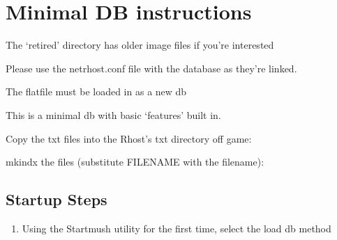 \documentclass[letterpaper,10pt,english]{sphinxmanual}
\begin{document}
\section{Minimal DB instructions}
\label{\detokenize{gettingstarted:minimal-db-instructions}}
\sphinxAtStartPar
The ‘retired’ directory has older image files if you’re interested

\sphinxAtStartPar
Please use the netrhost.conf file with the database as they’re linked.

\sphinxAtStartPar
The flatfile must be loaded in as a new db

\sphinxAtStartPar
This is a minimal db with basic ‘features’ built in.

\sphinxAtStartPar
Copy the txt files into the Rhost’s txt directory off game:

\begin{sphinxVerbatim}[commandchars=\\\{\}]
  
\end{sphinxVerbatim}

\sphinxAtStartPar
mkindx the files (substitute FILENAME with the filename):

\begin{sphinxVerbatim}[commandchars=\\\{\}]
 
  
\end{sphinxVerbatim}


\subsection{Startup Steps}
\label{\detokenize{gettingstarted:startup-steps}}\begin{enumerate}
%
\item {} 
\sphinxAtStartPar
Using the Startmush utility for the first time, select the load db method

\end{enumerate}
\end{document}
